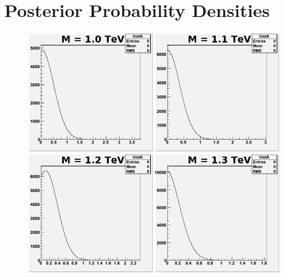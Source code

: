 \section{Posterior Probability Densities}
\label{appLike}

\begin{figure}[!ht]
  \begin{center}
     \includegraphics[width=0.48\textwidth]{Figures/MCpost1000_6_pe0.pdf}
     \includegraphics[width=0.48\textwidth]{Figures/MCpost1100_6_pe0.pdf}
     \includegraphics[width=0.48\textwidth]{Figures/MCpost1200_6_pe0.pdf}
     \includegraphics[width=0.48\textwidth]{Figures/MCpost1300_6_pe0.pdf}

\end{center}
\end{figure}
